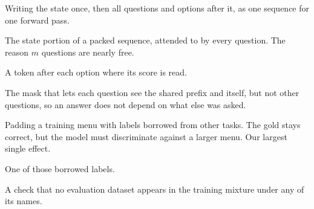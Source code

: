 \begin{description}[leftmargin=0em,style=nextline,itemsep=0.3em]

\item[Packing] Writing the state once, then all questions and options
after it, as one sequence for one forward pass.

\item[Shared prefix] The state portion of a packed sequence, attended to
by every question. The reason $m$ questions are nearly free.

\item[Marker] A token after each option where its score is read.

\item[Block-diagonal attention] The mask that lets each question see the
shared prefix and itself, but not other questions, so an answer does not
depend on what else was asked.

\item[Label-space augmentation] Padding a training menu with labels
borrowed from other tasks. The gold stays correct, but the model must
discriminate against a larger menu. Our largest single effect.

\item[Distractor] One of those borrowed labels.

\item[Contamination guard] A check that no evaluation dataset appears in
the training mixture under any of its names.

\end{description}
